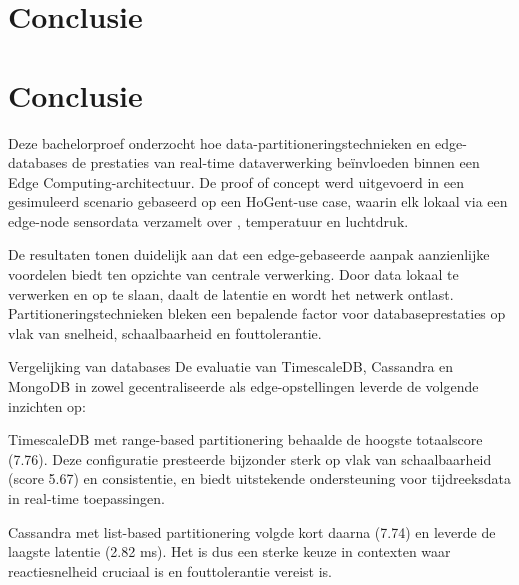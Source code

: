 
\chapter{Conclusie}%
\label{ch:conclusie}

\chapter{Conclusie}%
\label{ch:conclusie}

Deze bachelorproef onderzocht hoe data-partitioneringstechnieken en edge-databases de prestaties van real-time dataverwerking beïnvloeden binnen een Edge Computing-architectuur. De proof of concept werd uitgevoerd in een gesimuleerd scenario gebaseerd op een HoGent-use case, waarin elk lokaal via een edge-node sensordata verzamelt over , temperatuur en luchtdruk.

De resultaten tonen duidelijk aan dat een edge-gebaseerde aanpak aanzienlijke voordelen biedt ten opzichte van centrale verwerking. Door data lokaal te verwerken en op te slaan, daalt de latentie en wordt het netwerk ontlast. Partitioneringstechnieken bleken een bepalende factor voor databaseprestaties op vlak van snelheid, schaalbaarheid en fouttolerantie.

Vergelijking van databases
De evaluatie van TimescaleDB, Cassandra en MongoDB in zowel gecentraliseerde als edge-opstellingen leverde de volgende inzichten op:

TimescaleDB met range-based partitionering behaalde de hoogste totaalscore (7.76). Deze configuratie presteerde bijzonder sterk op vlak van schaalbaarheid (score 5.67) en consistentie, en biedt uitstekende ondersteuning voor tijdreeksdata in real-time toepassingen.

Cassandra met list-based partitionering volgde kort daarna (7.74) en leverde de laagste latentie (2.82 ms). Het is dus een sterke keuze in contexten waar reactiesnelheid cruciaal is en fouttolerantie vereist is.

